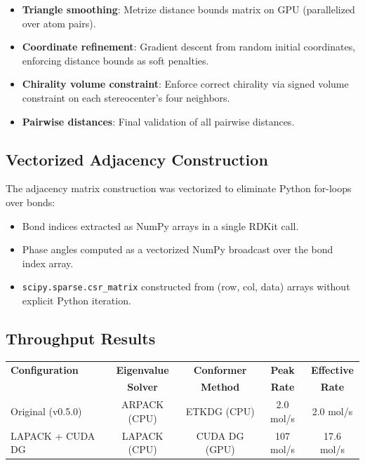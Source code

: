 \documentclass[11pt,a4paper]{article}
\begin{document}
\begin{itemize}[leftmargin=1.5em]
  \item \textbf{Triangle smoothing}: Metrize distance bounds matrix on GPU
    (parallelized over atom pairs).
  \item \textbf{Coordinate refinement}: Gradient descent from random initial
    coordinates, enforcing distance bounds as soft penalties.
  \item \textbf{Chirality volume constraint}: Enforce correct chirality via
    signed volume constraint on each stereocenter's four neighbors.
  \item \textbf{Pairwise distances}: Final validation of all pairwise distances.
\end{itemize}

\subsection{Vectorized Adjacency Construction}

The adjacency matrix construction was vectorized to eliminate Python for-loops
over bonds:

\begin{itemize}[leftmargin=1.5em]
  \item Bond indices extracted as NumPy arrays in a single RDKit call.
  \item Phase angles computed as a vectorized NumPy broadcast over the bond
    index array.
  \item \texttt{scipy.sparse.csr\_matrix} constructed from (row, col, data)
    arrays without explicit Python iteration.
\end{itemize}

\subsection{Throughput Results}

\begin{center}
\begin{tabular}{lcccc}
\toprule
\textbf{Configuration} & \textbf{Eigenvalue} & \textbf{Conformer} & \textbf{Peak} & \textbf{Effective} \\
& \textbf{Solver} & \textbf{Method} & \textbf{Rate} & \textbf{Rate} \\
\midrule
Original (v0.5.0)  & ARPACK (CPU) & ETKDG (CPU) & 2.0 mol/s  & 2.0 mol/s  \\
LAPACK + CUDA DG   & LAPACK (CPU) & CUDA DG (GPU) & 107 mol/s & 17.6 mol/s \\
\bottomrule
\end{tabular}
\end{center}
\end{document}
